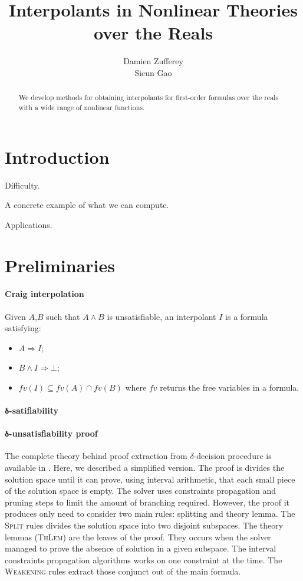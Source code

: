 \documentclass{acm_proc_article-sp}
\begin{document}
\title{Interpolants in Nonlinear Theories over the Reals}
\author{
\alignauthor
Damien Zufferey\\
\alignauthor
Sicun Gao
}
\maketitle
\begin{abstract}
We develop methods for obtaining interpolants for first-order formulas over the reals with a wide range of nonlinear functions. 
\end{abstract}

\section{Introduction}

Difficulty. 

A concrete example of what we can compute. 

Applications. 

\section{Preliminaries}

\paragraph{Craig interpolation}
Given $A$,$B$ such that $A ∧ B$ is unsatisfiable, an interpolant $I$ is a formula satisfying:
\begin{itemize}
\item $A ⇒ I$;
\item $B ∧ I ⇒ ⊥$;
\item $fv(I) ⊆ fv(A) ∩ fv(B)$ where $fv$ returns the free variables in a formula.
\end{itemize}

\paragraph{δ-satifiability}

\paragraph{δ-unsatisfiability proof}

The complete theory behind proof extraction from $\delta$-decision procedure is available in \cite{}.
Here, we described a simplified version.
The proof is divides the solution space until it can prove, using interval arithmetic, that each small piece of the solution space is empty.
The solver uses constraints propagation and pruning steps to limit the amount of branching required.
However, the proof it produces only need to consider two main rules: splitting and theory lemma.
The \textsc{Split} rules divides the solution space into two disjoint subspaces.
The theory lemmas (\textsc{ThLem}) are the leaves of the proof.
They occurs when the solver managed to prove the absence of solution in a given subspace.
The interval constraints propagation algorithms works on one constraint at the time. 
The \textsc{Weakening} rules extract those conjunct out of the main formula.
\end{document}
